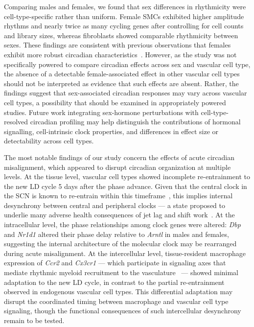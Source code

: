 \documentclass[12pt]{article}
\begin{document}
Comparing males and females, we found that sex differences in rhythmicity were cell-type-specific
rather than uniform. Female SMCs exhibited higher amplitude rhythms and nearly twice as many cycling
genes after controlling for cell counts and library sizes, whereas fibroblasts showed comparable
rhythmicity between sexes. These findings are consistent with previous observations that females exhibit more robust circadian characteristics~\cite{ref21}. However, as the study was not specifically powered to compare circadian effects across sex and vascular cell type, the absence of a detectable female-associated effect in other vascular cell types should not be interpreted as evidence that such effects are absent. 
Rather, the findings suggest that sex-associated circadian responses may vary across vascular cell types, a possibility that should be examined in appropriately powered studies. 
Future work integrating sex-hormone perturbations with cell-type-resolved circadian profiling may help distinguish the contributions of hormonal signalling, cell-intrinsic clock properties, and differences in effect size or detectability across cell types.

The most notable findings of our study concern the effects of acute circadian misalignment, which
appeared to disrupt circadian organization at multiple levels. At the tissue level, vascular cell
types showed incomplete re-entrainment to the new LD cycle 5 days after the phase advance. Given
that the central clock in the SCN is known to re-entrain within this timeframe~\cite{ref144}, this implies
internal desynchrony between central and peripheral clocks --- a state proposed to underlie many
adverse health consequences of jet lag and shift work~\cite{ref6}. At the intracellular level, the
phase relationships among clock genes were altered: \textit{Dbp} and \textit{Nr1d1} altered their
phase delay relative to \textit{Arntl} in males and females, suggesting the internal architecture of the molecular clock
may be rearranged during acute misalignment. At the intercellular level,
tissue-resident macrophage expression of \textit{Ccr2} and \textit{Cx3cr1} --- which participate in
signaling axes that mediate rhythmic myeloid recruitment to the
vasculature~\cite{ref4,ref89,ref90,ref91} --- showed minimal adaptation to the new LD cycle, in
contrast to the partial re-entrainment observed in endogenous vascular cell types. This differential
adaptation may disrupt the coordinated timing between macrophage and vascular cell type signaling,
though the functional consequences of such intercellular desynchrony remain to be tested.
\end{document}
